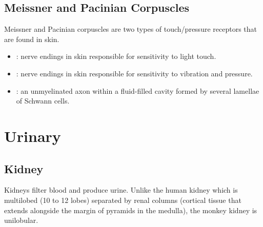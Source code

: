 \subsection{Meissner and Pacinian Corpuscles}
Meissner and Pacinian corpuscles are two types of touch/pressure receptors that are found in skin.
\begin{multicols}{2}
\begin{itemize}
  \item {}: nerve endings in skin responsible for sensitivity to light touch.
  
  \begin{center}
  \end{center}
  
  \item {}:  nerve endings in skin responsible for sensitivity to vibration and pressure.
  
  \begin{center}
  \end{center}

  \item {}: an unmyelinated axon within a fluid-filled cavity formed by several lamellae of Schwann cells. 
  
  \begin{center}
  \end{center}
  
\end{itemize}
\end{multicols}

\newpage
\section{Urinary}

\subsection{Kidney}
Kidneys filter blood and produce urine. Unlike the human kidney which is multilobed (10 to 12 lobes) separated by renal columns (cortical tissue that extends alongside the margin of pyramids in the medulla), the monkey kidney is unilobular.
\begin{center}
\end{center}

